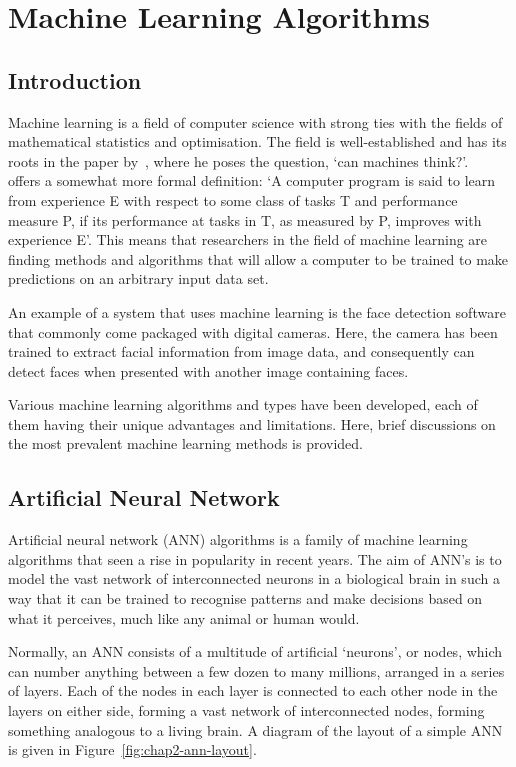 \section{Machine Learning Algorithms}

\subsection{Introduction}

Machine learning is a field of computer science with strong ties with the fields of mathematical statistics and optimisation. The field is well-established and has its roots in the paper by~\cite{turing1950computing}, where he poses the question, `can machines think?'.~\cite{michalski2013machine} offers a somewhat more formal definition: `A computer program is said to learn from experience E with respect to some class of tasks T and performance measure P, if its performance at tasks in T, as measured by P, improves with experience E'. This means that researchers in the field of machine learning are finding methods and algorithms that will allow a computer to be trained to make predictions on an arbitrary input data set. 

An example of a system that uses machine learning is the face detection software that commonly come packaged with digital cameras. Here, the camera has been trained to extract facial information from image data, and consequently can detect faces when presented with another image containing faces.

Various machine learning algorithms and types have been developed, each of them having their unique advantages and limitations. Here, brief discussions on the most prevalent machine learning methods is provided. 

\subsection{Artificial Neural Network}

Artificial neural network (ANN) algorithms is a family of machine learning algorithms that seen a rise in popularity in recent years. The aim of ANN's is to model the vast network of interconnected neurons in a biological brain in such a way that it can be trained to recognise patterns and make decisions based on what it perceives, much like any animal or human would. 

Normally, an ANN consists of a multitude of artificial `neurons', or nodes, which can number anything between a few dozen to many millions, arranged in a series of layers. Each of the nodes in each layer is connected to each other node in the layers on either side, forming a vast network of interconnected nodes, forming something analogous to a living brain. A diagram of the layout of a simple ANN is given in Figure~\ref{fig:chap2-ann-layout}.

